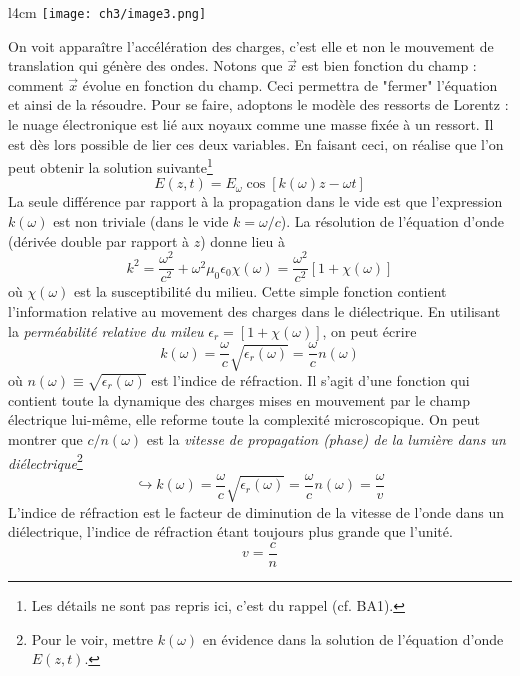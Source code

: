\begin{wrapfigure}[8]{l}{4cm}
	\vspace{-2mm}
	\texttt{[image: ch3/image3.png]}
	\end{wrapfigure}
On voit apparaître l'accélération des charges, c'est elle et non le mouvement de translation qui génère des ondes. 
Notons que $\vec{x}$ est bien fonction du champ : comment $\vec{x}$ évolue en fonction du champ. Ceci 
permettra de "fermer" l'équation et ainsi de la résoudre. Pour se faire, adoptons le modèle des ressorts 
de Lorentz : le nuage électronique est lié aux noyaux comme une masse fixée à un ressort. Il est dès lors 
possible de lier ces deux variables. En faisant ceci, on réalise que l'on peut obtenir la solution suivante\footnote{
Les détails ne sont pas repris ici, c'est du rappel (cf. BA1).}
\begin{equation}
E(z,t) = E_\omega \cos[k(\omega)z-\omega t]
\end{equation}
La seule différence par rapport à la propagation dans le vide est que l'expression $k(\omega)$ est non 
triviale (dans le vide $k=\omega/c$). La résolution de l'équation d'onde (dérivée double par rapport à 
$z$) donne lieu à
\begin{equation}
k^2=\dfrac{\omega^2}{c^2}+\omega^2\mu_0\epsilon_0\chi(\omega) = \dfrac{\omega^2}{c^2}[1+\chi(\omega)]
\end{equation}
où $\chi(\omega)$ est la susceptibilité du milieu. Cette simple fonction contient l'information relative 
au movement des charges dans le diélectrique. En utilisant la \textit{perméabilité relative du mileu} 
$\epsilon_r = [1+\chi(\omega)]$, on peut écrire
\begin{equation}
k(\omega) = \dfrac{\omega}{c}\sqrt{\epsilon_r(\omega)} = \dfrac{\omega}{c} n(\omega)
\end{equation}
où $n(\omega) \equiv \sqrt{\epsilon_r(\omega)}$ est l'indice de réfraction. Il s'agit d'une fonction 
qui contient toute la dynamique des charges mises en mouvement par le champ électrique lui-même, elle 
reforme toute la complexité microscopique. On peut montrer que $c/n(\omega)$ est la \textit{vitesse de 
propagation (phase) de la lumière dans un diélectrique}\footnote{Pour le voir, mettre $k(\omega)$ en évidence 
dans la solution de l'équation d'onde $E(z,t)$.}
\begin{equation}
\hookrightarrow k(\omega) = \dfrac{\omega}{c}\sqrt{\epsilon_r(\omega)} = \dfrac{\omega}{c} n(\omega) = 
\dfrac{\omega}{v}
\end{equation}
L'indice de réfraction est le facteur de diminution de la vitesse de l'onde dans un diélectrique, 
l'indice de réfraction étant toujours plus grande que l'unité.
\begin{equation}
v = \frac{c}{n}
\end{equation}


